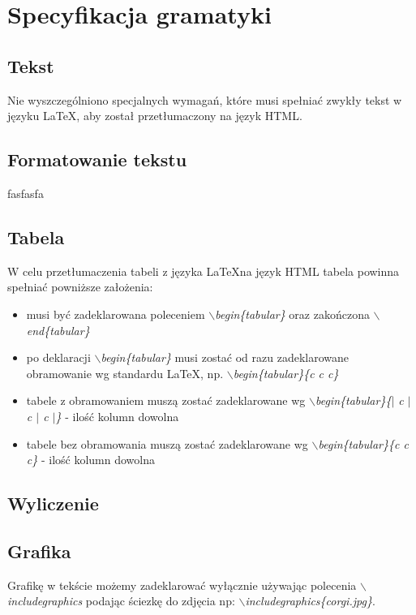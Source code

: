 \chapter{Specyfikacja gramatyki}

\section{Tekst}
Nie wyszczególniono specjalnych wymagań, które musi spełniać zwykły tekst w języku \LaTeX \space, 
aby został przetłumaczony na język HTML.

\section{Formatowanie tekstu}
    fasfasfa

\section{Tabela}
W celu przetłumaczenia tabeli z języka \LaTeX \space na język HTML tabela powinna spełniać powniższe założenia: 
\begin{itemize}
    \item musi być zadeklarowana poleceniem \textit{$\backslash$begin\{tabular\}} oraz zakończona \textit{$\backslash$end\{tabular\}}
    \item po deklaracji \textit{$\backslash$begin\{tabular\}} musi zostać od razu zadeklarowane obramowanie wg standardu \LaTeX \space,
    np. \textit{$\backslash$begin\{tabular\}\{c c c\}}
    \item tabele z obramowaniem muszą zostać zadeklarowane wg \textit{$\backslash$begin\{tabular\}\{$|$ c $|$ c $|$ c $|$\}} - ilość kolumn dowolna
    \item tabele bez obramowania muszą zostać zadeklarowane wg \textit{$\backslash$begin\{tabular\}\{c c c\}}  - ilość kolumn dowolna
\end{itemize}

\section{Wyliczenie}

\section{Grafika}
Grafikę w tekście możemy zadeklarować wyłącznie używając polecenia \textit{$\backslash$includegraphics} podając ściezkę do zdjęcia np: 
\textit{$\backslash$includegraphics\{corgi.jpg\}}.

